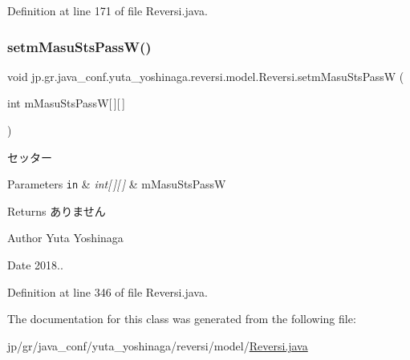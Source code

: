 Definition at line 171 of file Reversi.\+java.

\mbox{\label{classjp_1_1gr_1_1java__conf_1_1yuta__yoshinaga_1_1reversi_1_1model_1_1_reversi_abc3f2428451363bde194d0655ef2ffd7}} 
\subsubsection{\texorpdfstring{setm\+Masu\+Sts\+Pass\+W()}{setmMasuStsPassW()}}
{\footnotesize\ttfamily void jp.\+gr.\+java\+\_\+conf.\+yuta\+\_\+yoshinaga.\+reversi.\+model.\+Reversi.\+setm\+Masu\+Sts\+PassW (\begin{DoxyParamCaption}\item[{int}]{m\+Masu\+Sts\+PassW\mbox{[}$\,$\mbox{]}\mbox{[}$\,$\mbox{]} }\end{DoxyParamCaption})}



セッター 


\begin{DoxyParams}[1]{Parameters}
\mbox{\tt in}  & {\em int\mbox{[}$\,$\mbox{]}\mbox{[}$\,$\mbox{]}} & m\+Masu\+Sts\+PassW \\
\hline
\end{DoxyParams}
\begin{DoxyReturn}{Returns}
ありません 
\end{DoxyReturn}
\begin{DoxyAuthor}{Author}
Yuta Yoshinaga 
\end{DoxyAuthor}
\begin{DoxyDate}{Date}
2018.. 
\end{DoxyDate}


Definition at line 346 of file Reversi.\+java.



The documentation for this class was generated from the following file\+:\begin{DoxyCompactItemize}
\item 
jp/gr/java\+\_\+conf/yuta\+\_\+yoshinaga/reversi/model/\hyperlink{_reversi_8java}{Reversi.\+java}\end{DoxyCompactItemize}
